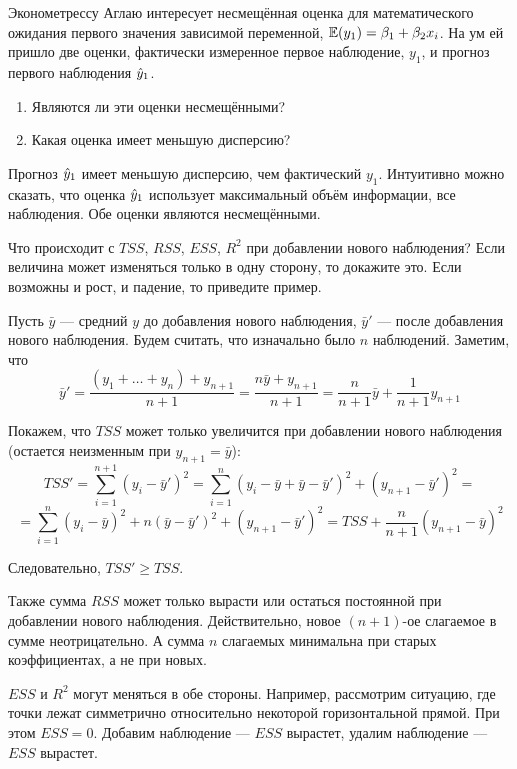 \begin{problem}
Эконометрессу Аглаю интересует несмещённая оценка для математического ожидания первого значения зависимой переменной, $\mathbb{E}(y_1)= \beta_1 + \beta_2 x_i$. На ум ей пришло две оценки, фактически измеренное первое наблюдение, $y_1$, и прогноз первого наблюдения $\hat{y}_1$.
\begin{enumerate}
\item Являются ли эти оценки несмещёнными?
\item Какая оценка имеет меньшую дисперсию?
\end{enumerate}


\begin{sol}
Прогноз $\hat{y}_1$ имеет меньшую дисперсию, чем фактический $y_1$. Интуитивно можно сказать, что оценка $\hat{y}_1$ использует максимальный объём информации, все наблюдения. Обе оценки являются несмещёнными.
\end{sol}
\end{problem}



\begin{problem}
Что происходит с $TSS$, $RSS$, $ESS$, $R^2$ при добавлении нового наблюдения? Если величина может изменяться только в одну сторону, то докажите это. Если возможны и рост, и падение, то приведите пример.


\begin{sol}
Пусть \(\bar{y}\) — средний \(y\) до добавления нового наблюдения, \(\bar{y}'\) — после добавления нового наблюдения. Будем считать, что изначально было \(n\) наблюдений. Заметим, что
\[\bar{y}' = \frac{(y_1 + \ldots + y_n) + y_{n+1}}{n + 1} = \frac{n \bar{y} + y_{n + 1}}{n + 1} = \frac{n}{n+ 1}\bar{y} + \frac{1}{n+1}y_{n+1}\]

Покажем, что \(TSS\) может только увеличится при добавлении нового наблюдения (остается неизменным при \(y_{n+1} = \bar{y}\)):
\[TSS'= \sum_{i = 1}^{n + 1} (y_i - \bar{y}')^2 = \sum_{i = 1}^{n} (y_i - \bar{y} + \bar{y} - \bar{y}')^2 + (y_{n + 1} - \bar{y}')^2 = \]
\[=\sum_{i = 1}^{n} (y_i - \bar{y})^2 + n(\bar{y} - \bar{y}')^2 + (y_{n + 1} - \bar{y}')^2  = TSS + \frac{n}{n+1} (y_{n+1} - \bar{y})^2\]

Следовательно, \(TSS' \geqslant TSS\).

Также сумма \(RSS\) может только вырасти или остаться постоянной при добавлении нового наблюдения. Действительно, новое $(n+1)$-ое слагаемое в сумме неотрицательно. А сумма $n$ слагаемых минимальна при старых коэффициентах, а не при новых.

\(ESS\) и \(R^2\) могут меняться в обе стороны. Например, рассмотрим ситуацию, где точки лежат симметрично относительно некоторой горизонтальной прямой. При этом $ESS=0$. Добавим наблюдение — $ESS$ вырастет, удалим наблюдение — $ESS$ вырастет.
\end{sol}
\end{problem}



